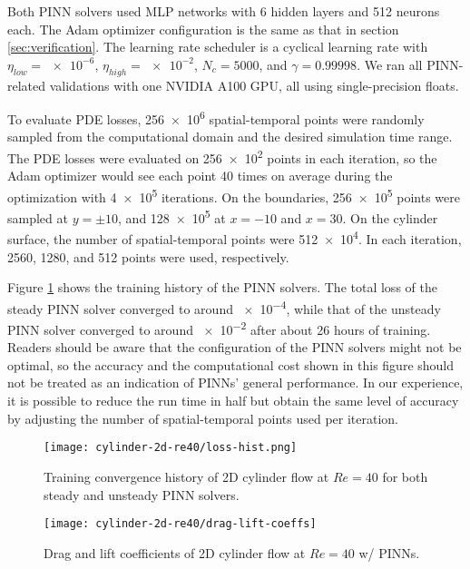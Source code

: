 Both PINN solvers used MLP networks with \num{6} hidden layers and \num{512} neurons each.
The Adam optimizer configuration is the same as that in section \ref{sec:verification}.
The learning rate scheduler is a cyclical learning rate with $\eta_{low}=\num{e-6}$, $\eta_{high}=\num{e-2}$, $N_c=\num{5000}$, and $\gamma={0.99998}$.
We ran all PINN-related validations with one NVIDIA A100 GPU,
all using single-precision floats.

To evaluate PDE losses, \num{256e6} spatial-temporal points were randomly sampled from the computational domain and the desired simulation time range.
The PDE losses were evaluated on \num{256e2} points in each iteration, so the Adam optimizer would see each point \num{40} times on average during the optimization with \num{4e5} iterations.
On the boundaries, \num{256e5} points were sampled  at $y=\pm 10$, and \num{128e5} at $x=-10$ and $x=30$.
On the cylinder surface, the number of spatial-temporal points were \num{512e4}.
In each iteration, \num{2560}, \num{1280}, and \num{512} points were used, respectively.

Figure \ref{fig:cylinder-re40-pinn-loss} shows the training history of the PINN solvers.
The total loss of the steady PINN solver converged to around \num{e-4}, while that of the unsteady PINN solver converged to around \num{e-2} after about 26 hours of training.
Readers should be aware that the configuration of the PINN solvers might not be optimal, so the accuracy and the computational cost shown in this figure should not be treated as an indication of PINNs' general performance.
In our experience, it is possible to reduce the run time in half but obtain the same level of accuracy by adjusting the number of spatial-temporal points used per iteration.

\begin{figure}
    \centering%
    \texttt{[image: cylinder-2d-re40/loss-hist.png]}%
    \caption{%
        Training convergence history of 2D cylinder flow at $Re=\num{40}$ for both steady and unsteady PINN solvers.
    }
    \label{fig:cylinder-re40-pinn-loss}%
\end{figure}


\begin{figure}
    \centering%
    \texttt{[image: cylinder-2d-re40/drag-lift-coeffs]}%
    \caption{%
        Drag and lift coefficients of 2D cylinder flow at $Re=\num{40}$ w/ PINNs.
    }
    \label{fig:cylinder-re40-drag-lift}%
\end{figure}

